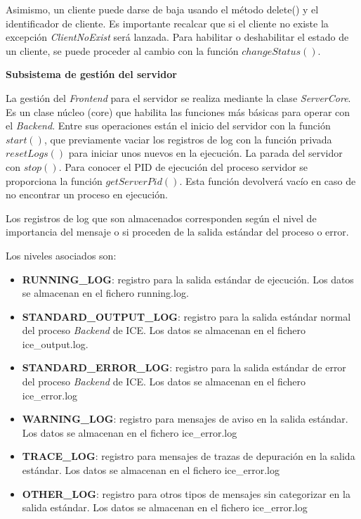 Asimismo, un cliente puede darse de baja usando el método delete() y el
identificador de cliente. Es importante recalcar que si el cliente no existe 
la excepción \emph{ClientNoExist} será lanzada. Para habilitar o deshabilitar el
estado de un cliente, se puede proceder al cambio con la función
$changeStatus()$.

\textbf{Subsistema de gestión del servidor}

La gestión del \emph{Frontend} para el servidor se realiza mediante la clase
\emph{ServerCore}. Es un clase núcleo (core) que habilita las funciones más
básicas para operar con el \emph{Backend}. Entre sus operaciones están el inicio
del servidor con la función $start()$, que previamente vaciar los registros de
log con la función privada $resetLogs()$ para iniciar unos nuevos en la
ejecución. La parada del servidor con $stop()$. Para conocer el PID de ejecución
del proceso servidor se proporciona la función $getServerPid()$. Esta función devolverá vacío en caso de no
encontrar un proceso en ejecución.

\newpage

Los registros de log que son almacenados corresponden según el nivel de
importancia del mensaje o si proceden de la salida estándar del proceso o error.

Los niveles asociados son:

\begin{itemize}
    \item \textbf{RUNNING\_LOG}: registro para la salida estándar de
    ejecución. Los datos se almacenan en el fichero running.log.
    \item \textbf{STANDARD\_OUTPUT\_LOG}: registro para la salida estándar
    normal del proceso \emph{Backend} de ICE. Los datos se almacenan en el
    fichero ice\_output.log.
    \item \textbf{STANDARD\_ERROR\_LOG}: registro para la salida estándar de
    error del proceso \emph{Backend} de ICE. Los datos se almacenan en el
    fichero ice\_error.log
    \item \textbf{WARNING\_LOG}: registro para mensajes de aviso en la salida
    estándar. Los datos se almacenan en el fichero ice\_error.log
    \item \textbf{TRACE\_LOG}: registro para mensajes de trazas de depuración en
    la salida estándar. Los datos se almacenan en el fichero ice\_error.log
    \item \textbf{OTHER\_LOG}: registro para otros tipos de mensajes sin
    categorizar en la salida estándar. Los datos se almacenan en el fichero
    ice\_error.log
\end{itemize}

